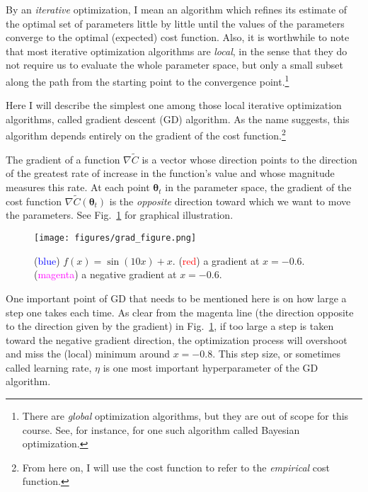 \documentclass{report}
\newcommand{\vects}[1]{\boldsymbol{#1}}
\newcommand{\TT}[0]{\vects{\theta}}
\begin{document}
By an {\em iterative} optimization, I mean an algorithm which refines its
estimate of the optimal set of parameters little by little until the values of
the parameters converge to the optimal (expected) cost function. Also, it is
worthwhile to note that most iterative optimization algorithms are {\em local},
in the sense that they do not require us to evaluate the whole parameter space,
but only a small subset along the path from the starting point to the
convergence point.\footnote{
    There are {\em global} optimization algorithms, but they are out of scope
    for this course. See, for instance, \cite{Brochu2010} for one such algorithm
    called Bayesian optimization.
}

Here I will describe the simplest one among those local iterative optimization
algorithms, called gradient descent (GD) algorithm. As the name suggests, this
algorithm depends entirely on the gradient of the cost function.\footnote{
    From here on, I will use the cost function to refer to the {\em empirical}
    cost function.
} 

The gradient of a function $\nabla \tilde{C}$ is a vector whose direction points
to the direction of the greatest rate of increase in the function's value and
whose magnitude measures this rate. At each point $\TT_t$ in the parameter
space, the gradient of the cost function $\nabla \tilde{C}(\TT_t)$ is the {\em
opposite} direction toward which we want to move the parameters. See
Fig.~\ref{fig:grad} for graphical illustration.

\begin{figure}
    \centering
    \begin{minipage}{0.6\textwidth}
        \texttt{[image: figures/grad\_figure.png]}
    \end{minipage}
    \hfill
    \begin{minipage}{0.39\textwidth}
        \caption{(\textcolor{blue}{blue}) $f(x) = \sin(10 x) + x$.
            (\textcolor{red}{red}) a gradient at $x=-0.6$.
        (\textcolor{magenta}{magenta}) a negative gradient at $x=-0.6$.}
        \label{fig:grad}
    \end{minipage}
\end{figure}

One important point of GD that needs to be mentioned here is on how large a step
one takes each time. As clear from the magenta line (the direction opposite to
the direction given by the gradient) in Fig.~\ref{fig:grad}, if too large a step
is taken toward the negative gradient direction, the optimization process will
overshoot and miss the (local) minimum around $x=-0.8$. This step size, or
sometimes called learning rate, $\eta$ is one most important hyperparameter of
the GD algorithm.
\end{document}
